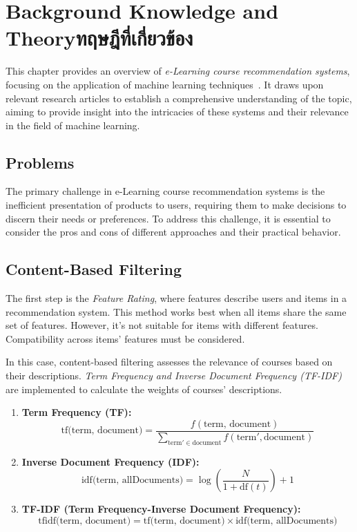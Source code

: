 \chapter{\ifenglish Background Knowledge and Theory\else ทฤษฎีที่เกี่ยวข้อง\fi}

This chapter provides an overview of \textit{e-Learning course recommendation systems}, focusing on 
the application of machine learning techniques~\cite{5432716}. It draws upon relevant research articles 
to establish a comprehensive understanding of the topic, aiming to provide insight into 
the intricacies of these systems and their relevance in the field of machine learning.

\section{Problems}

The primary challenge in e-Learning course recommendation systems is the inefficient presentation 
of products to users, requiring them to make decisions to discern their needs or preferences. 
To address this challenge, it is essential to consider the pros and cons of different approaches 
and their practical behavior.

\section{Content-Based Filtering}

The first step is the \textit{Feature Rating}, where features describe users and items in a 
recommendation system. This method works best when all items share the same set of features. 
However, it's not suitable for items with different features. Compatibility across items' features 
must be considered.

In this case, content-based filtering assesses the relevance of courses based on their descriptions. 
\textit{Term Frequency and Inverse Document Frequency (TF-IDF)} are implemented to calculate the weights of 
courses' descriptions.

\begin{enumerate}
  \item \textbf{Term Frequency (TF):}
  \begin{equation}
    \text{tf(term, document)} = \frac{f(\text{term, document})}{\sum_{\text{term}' \in \text{document}} f(\text{term}', \text{document})}
  \end{equation}
  \item \textbf{Inverse Document Frequency (IDF):}
  \begin{equation}
    \text{idf(term, allDocuments)} = \log \left( \frac{N}{1 + \text{df}(t)} \right) + 1
  \end{equation}
  \item \textbf{TF-IDF (Term Frequency-Inverse Document Frequency):}
  \begin{equation}
    \text{tfidf(term, document)} = \text{tf(term, document)} \times \text{idf(term, allDocuments)}
  \end{equation}
\end{enumerate}

